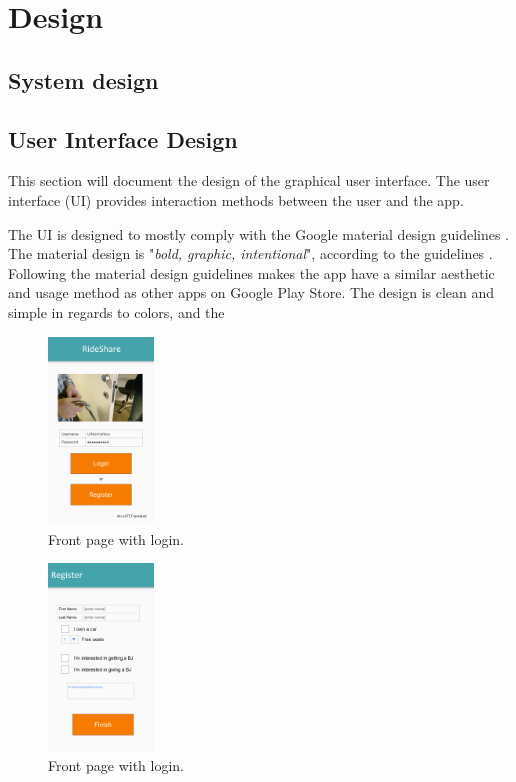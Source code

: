 \section{Design}

\subsection{System design}


\subsection{User Interface Design}
This section will document the design of the graphical user interface.
The user interface (UI) provides interaction methods between the user and the app.

The UI is designed to mostly comply with the Google material design guidelines \cite{materialDesign}. The material design is "\textit{bold, graphic, intentional}", according to the guidelines \cite{materialDesign}. Following the material design guidelines makes the app have a similar aesthetic and usage method as other apps on Google Play Store. The design is clean and simple in regards to colors, and the

\begin{figure}
	\centering
	\includegraphics[width=0.25\textwidth]{figures/GUI-front.png}
	\caption{Front page with login.}
\end{figure}

\begin{figure}
	\centering
	\includegraphics[width=0.25\textwidth]{figures/GUI-register.png}
	\caption{Front page with login.}
\end{figure}

